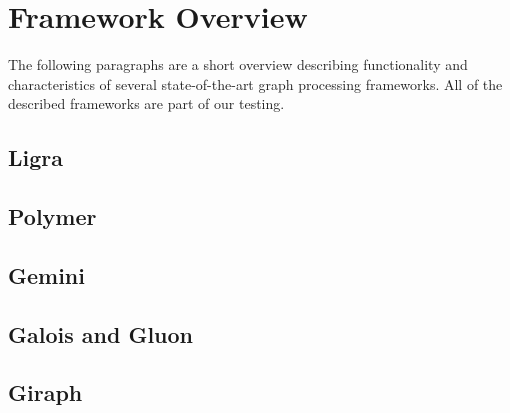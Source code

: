 
\section{Framework Overview}
The following paragraphs are a short overview describing functionality and characteristics of several state-of-the-art graph processing frameworks.
All of the described frameworks are part of our testing.

\subsection{Ligra}


\subsection{Polymer}


\subsection{Gemini}


\subsection{Galois and Gluon}


\subsection{Giraph}





